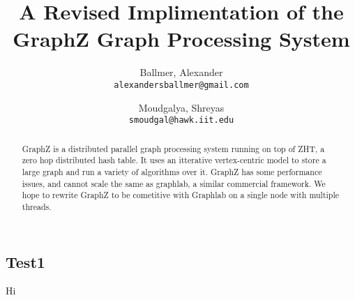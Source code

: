 \documentclass[10pt]{article}
\begin{document}
\title{A Revised Implimentation of the GraphZ Graph Processing System}

\author{
  Ballmer, Alexander\\
  \texttt{alexandersballmer@gmail.com}
  \and
  Moudgalya, Shreyas\\
  \texttt{smoudgal@hawk.iit.edu}
  }

\maketitle

\begin{abstract}
  GraphZ is a distributed parallel graph processing system running on top of ZHT, a zero hop distributed hash table. It uses an itterative vertex-centric model to store a large graph and run a variety of algorithms over it. GraphZ has some performance issues, and cannot scale the same as graphlab, a similar commercial framework. We hope to rewrite GraphZ to be cometitive with Graphlab on a single node with multiple threads.
\end{abstract}

\begin{multicols}{2} 
  \section{Test1}
  Hi

\end{multicols}
\end{document}
